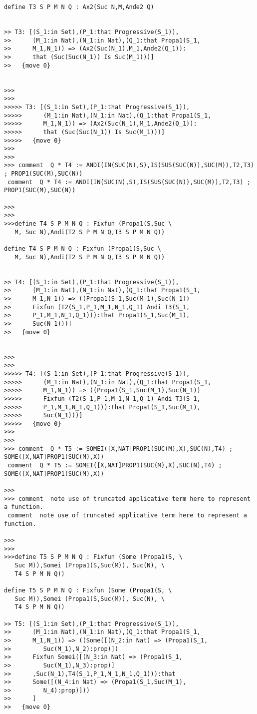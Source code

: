\documentclass{article}
\begin{document}
\begin{verbatim}
define T3 S P M N Q : Ax2(Suc N,M,Ande2 Q)


>> T3: [(S_1:in Set),(P_1:that Progressive(S_1)),
>>      (M_1:in Nat),(N_1:in Nat),(Q_1:that Propa1(S_1,
>>      M_1,N_1)) => (Ax2(Suc(N_1),M_1,Ande2(Q_1)):
>>      that (Suc(Suc(N_1)) Is Suc(M_1)))]
>>   {move 0}


>>>
>>>
>>>>> T3: [(S_1:in Set),(P_1:that Progressive(S_1)),
>>>>>      (M_1:in Nat),(N_1:in Nat),(Q_1:that Propa1(S_1,
>>>>>      M_1,N_1)) => (Ax2(Suc(N_1),M_1,Ande2(Q_1)):
>>>>>      that (Suc(Suc(N_1)) Is Suc(M_1)))]
>>>>>   {move 0}
>>>
>>>
>>> comment  Q * T4 := ANDI(IN(SUC(N),S),IS(SUS(SUC(N)),SUC(M)),T2,T3) ; PROP1(SUC(M),SUC(N))
 comment  Q * T4 := ANDI(IN(SUC(N),S),IS(SUS(SUC(N)),SUC(M)),T2,T3) ; PROP1(SUC(M),SUC(N))

>>>
>>>
>>>define T4 S P M N Q : Fixfun (Propa1(S,Suc \
   M, Suc N),Andi(T2 S P M N Q,T3 S P M N Q))

define T4 S P M N Q : Fixfun (Propa1(S,Suc \
   M, Suc N),Andi(T2 S P M N Q,T3 S P M N Q))


>> T4: [(S_1:in Set),(P_1:that Progressive(S_1)),
>>      (M_1:in Nat),(N_1:in Nat),(Q_1:that Propa1(S_1,
>>      M_1,N_1)) => ((Propa1(S_1,Suc(M_1),Suc(N_1))
>>      Fixfun (T2(S_1,P_1,M_1,N_1,Q_1) Andi T3(S_1,
>>      P_1,M_1,N_1,Q_1))):that Propa1(S_1,Suc(M_1),
>>      Suc(N_1)))]
>>   {move 0}


>>>
>>>
>>>>> T4: [(S_1:in Set),(P_1:that Progressive(S_1)),
>>>>>      (M_1:in Nat),(N_1:in Nat),(Q_1:that Propa1(S_1,
>>>>>      M_1,N_1)) => ((Propa1(S_1,Suc(M_1),Suc(N_1))
>>>>>      Fixfun (T2(S_1,P_1,M_1,N_1,Q_1) Andi T3(S_1,
>>>>>      P_1,M_1,N_1,Q_1))):that Propa1(S_1,Suc(M_1),
>>>>>      Suc(N_1)))]
>>>>>   {move 0}
>>>
>>>
>>> comment  Q * T5 := SOMEI([X,NAT]PROP1(SUC(M),X),SUC(N),T4) ; SOME([X,NAT]PROP1(SUC(M),X))
 comment  Q * T5 := SOMEI([X,NAT]PROP1(SUC(M),X),SUC(N),T4) ; SOME([X,NAT]PROP1(SUC(M),X))

>>>
>>> comment  note use of truncated applicative term here to represent a function.
 comment  note use of truncated applicative term here to represent a function.

>>>
>>>
>>>define T5 S P M N Q : Fixfun (Some (Propa1(S, \
   Suc M)),Somei (Propa1(S,Suc(M)), Suc(N), \
   T4 S P M N Q))

define T5 S P M N Q : Fixfun (Some (Propa1(S, \
   Suc M)),Somei (Propa1(S,Suc(M)), Suc(N), \
   T4 S P M N Q))

>> T5: [(S_1:in Set),(P_1:that Progressive(S_1)),
>>      (M_1:in Nat),(N_1:in Nat),(Q_1:that Propa1(S_1,
>>      M_1,N_1)) => ((Some([(N_2:in Nat) => (Propa1(S_1,
>>         Suc(M_1),N_2):prop)])
>>      Fixfun Somei([(N_3:in Nat) => (Propa1(S_1,
>>         Suc(M_1),N_3):prop)]
>>      ,Suc(N_1),T4(S_1,P_1,M_1,N_1,Q_1))):that
>>      Some([(N_4:in Nat) => (Propa1(S_1,Suc(M_1),
>>         N_4):prop)]))
>>      ]
>>   {move 0}



\end{verbatim}
\end{document}
